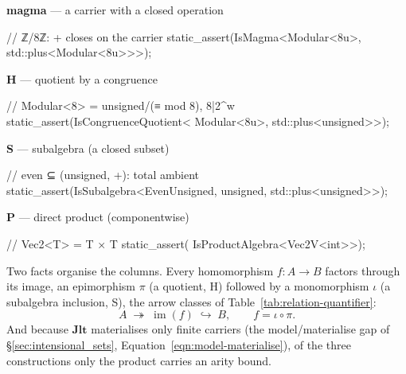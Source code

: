 \documentclass[11pt, a4paper]{article}
\begin{document}
\begin{listing}[!ht]
\caption{Section~\ref{sec:algebraic_lattice_carriers} at a glance: four capabilities, each a checked-in .  A magma is a carrier with a closed operation; the three Birkhoff constructions each build a new carrier from it --- S and P carry the certificate across by trait propagation, while the relational H \emph{witnesses} the quotient by its congruence.  The section develops each below.}
\label{lst:alg-capabilities}
\noindent
\begin{minipage}[t]{0.49\linewidth}
\textbf{magma} --- a carrier with a closed operation
\begin{cpp}
// ℤ/8ℤ: + closes on the carrier
static_assert(IsMagma<Modular<8u>,
                std::plus<Modular<8u>>>);
\end{cpp}
\textbf{H} --- quotient by a congruence
\begin{cpp}
// Modular<8> = unsigned/(≡ mod 8), 8|2^w
static_assert(IsCongruenceQuotient<
    Modular<8u>, std::plus<unsigned>>);
\end{cpp}
\end{minipage}\hfill
\begin{minipage}[t]{0.49\linewidth}
\textbf{S} --- subalgebra (a closed subset)
\begin{cpp}
// even ⊆ (unsigned, +): total ambient
static_assert(IsSubalgebra<EvenUnsigned,
    unsigned, std::plus<unsigned>>);
\end{cpp}
\textbf{P} --- direct product (componentwise)
\begin{cpp}
// Vec2<T> = T × T
static_assert(
    IsProductAlgebra<Vec2V<int>>);
\end{cpp}
\end{minipage}
\end{listing}

Two facts organise the columns.
Every homomorphism $f\colon A\to B$ factors through its image, an epimorphism $\pi$ (a quotient, H) followed by a monomorphism $\iota$ (a subalgebra inclusion, S), the arrow classes of Table~\ref{tab:relation-quantifier}:
\begin{equation}
\label{eqn:image-factorization}
  A \;\twoheadrightarrow\; \operatorname{im}(f) \;\hookrightarrow\; B,
  \qquad f = \iota \circ \pi .
\end{equation}
And because $\mathbf{Jlt}$ materialises only finite carriers (the model/materialise gap of \S\ref{sec:intensional_sets}, Equation~\ref{eqn:model-materialise}), of the three constructions only the product carries an arity bound.
\end{document}
